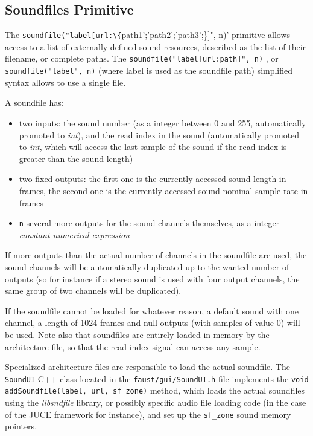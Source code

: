 \bigskip

\subsection{Soundfiles Primitive}

The  \lstinline'soundfile("label[url:\{'path1';'path2';'path3';\}]", n)' primitive allows access to a list of externally defined sound resources, described as the list of their filename, or complete paths. The \lstinline'soundfile("label[url:path]", n)' , or \lstinline'soundfile("label", n)' (where label is used as the soundfile path) simplified syntax allows to use a single file. 

A soundfile has:

\begin{itemize} 
\item two inputs: the sound number (as a integer between 0 and 255, automatically promoted to \textit{int}), and the read index in the sound (automatically promoted to \textit{int}, which will access the last sample of the sound if the read index is greater than the sound length)
\item two fixed outputs: the first one is the currently accessed sound length in frames, the second one is the currently accessed sound nominal sample rate in frames
\item  \lstinline'n' several more outputs for the sound channels themselves, as a integer \textit{constant numerical expression}
\end{itemize}

If more outputs than the actual number of channels in the soundfile are used, the sound channels will be automatically duplicated up to the wanted number of outputs (so for instance if a stereo sound is used with four output channels, the same group of two channels will be duplicated).

If the soundfile cannot be loaded for whatever reason, a default sound with one channel, a length of 1024 frames and null outputs (with samples of value 0) will be used. Note also that soundfiles are entirely loaded in memory by the architecture file, so that the read index signal can access any sample.

Specialized architecture files are responsible to load the actual soundfile. The \lstinline'SoundUI' C++ class located in the \lstinline'faust/gui/SoundUI.h' file implements the \lstinline'void addSoundfile(label, url, sf_zone)' method, which loads the actual soundfiles using the {\it libsndfile} library, or possibly specific audio file loading code (in the case of the JUCE framework for instance), and set up the \lstinline'sf_zone' sound memory pointers. 

